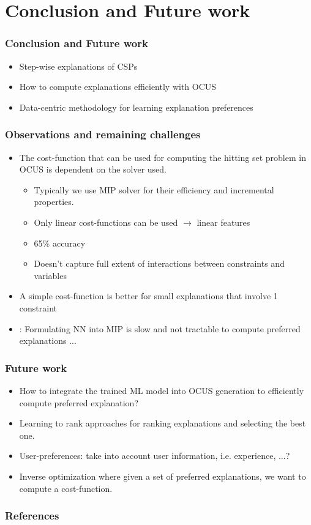 \documentclass{beamer}
\renewcommand\emph[1]{{\color{vuborange}#1}}
\begin{document}
		\section{Conclusion and Future work}
		 \begin{frame}
			\tableofcontents[currentsection]
		\end{frame}			
%		
\begin{frame}
	\frametitle{Conclusion and Future work}
	\begin{itemize}
		\item Step-wise explanations of CSPs
		\item How to compute explanations efficiently with OCUS
		\item Data-centric methodology for learning explanation preferences
	\end{itemize}
	
\end{frame}
%		
\begin{frame}
	\frametitle{Observations and remaining challenges}
	\begin{itemize}
		\item The cost-function that can be used for computing the hitting set problem in OCUS is dependent on the solver used.
		\begin{itemize}
			\item Typically we use MIP solver for their efficiency and incremental properties.
			\item Only linear cost-functions can be used $\rightarrow$ linear features
			\item 65\% accuracy
			\item Doesn't capture full extent of interactions between constraints and variables
		\end{itemize}\pause
		\item A simple cost-function is better for small explanations that involve 1 constraint \pause
		\item \cite{akutsu2019mixed}: Formulating NN into MIP  is slow and not tractable to compute preferred explanations ...
	\end{itemize}
\end{frame}
				
	\begin{frame}
		\frametitle{Future work}
		\begin{itemize}
			\item How to integrate the trained ML model into OCUS generation to \emph{efficiently} compute preferred explanation?
			\item Learning to rank approaches for ranking explanations and selecting the best one.
			\item User-preferences: take into account user information, i.e. experience, ...?
			\item Inverse optimization where given a set of preferred explanations, we want to compute a cost-function.
		\end{itemize}
	\end{frame}
			
		\begin{frame}[allowframebreaks]
			\frametitle{References}
			
			
		\end{frame}		
	
	
\end{document}
